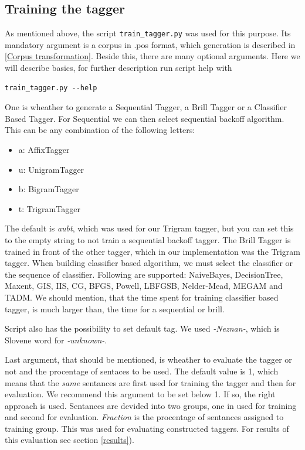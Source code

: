 \documentclass[10pt, conference, compsocconf]{IEEEtran}
\begin{document}
\subsection{Training the tagger} %
As mentioned above, the script \texttt{train\_tagger.py} was used for this purpose. Its mandatory argument is a corpus in .pos format, which generation is described in \ref{Corpus transformation}. Beside this, there are many optional arguments. Here we will describe basics, for further description run script help with
\begin{lstlisting}
train_tagger.py --help
\end{lstlisting}
\par
One is wheather to generate a Sequential Tagger, a Brill Tagger or a Classifier Based Tagger. For Sequential we can then select sequential backoff algorithm. This can be any combination of the following letters:
\begin{itemize}
\item a: AffixTagger
\item u: UnigramTagger
\item b: BigramTagger
\item t: TrigramTagger
\end{itemize}
The default is \textit{aubt}, which was used for our Trigram tagger, but you can set this to the empty string to not train a sequential backoff tagger. The Brill Tagger is trained in front of the other tagger, which in our implementation was the Trigram tagger. When building classifier based algorithm, we must select the classifier or the sequence of classifier. Following are supported: NaiveBayes, DecisionTree, Maxent, GIS, IIS, CG, BFGS, Powell, LBFGSB, Nelder-Mead, MEGAM and TADM. We should mention, that the time spent for training classifier based tagger, is much larger than, the time for a sequential or brill.
\par
Script also has the possibility to set default tag. We used \textit{-Neznan-}, which is Slovene word for \textit{-unknown-}.
\par
Last argument, that should be mentioned, is wheather to evaluate the tagger or not and the procentage of sentaces to be used. The default value is 1, which means that the \textit{same} sentances are first used for training the tagger and then for evaluation. We recommend this argument to be set below 1. If so, the right approach is used.
Sentances are devided into two groups, one in used for training and second for evaluation. \textit{Fraction} is the procentage of sentances assigned to training group. 
This was used for evaluating constructed taggers. For results of this evaluation see section \ref{results}).
\end{document}
